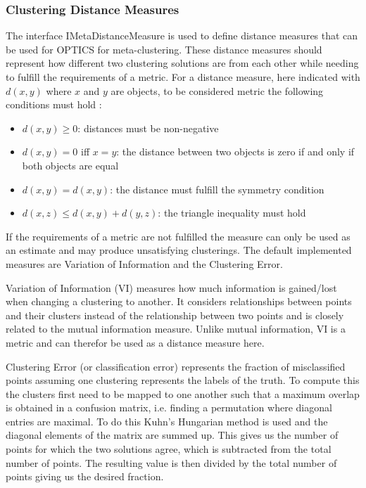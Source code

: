 \documentclass[
	a4paper,
	english,
	twoside,
	openright,               
	11pt                            
	]{report}
\begin{document}
\subsubsection{Clustering Distance Measures}
The interface IMetaDistanceMeasure is used to define distance measures that can be used for OPTICS for meta-clustering. These distance measures should represent how different two clustering solutions are from each other while needing to fulfill the requirements of a metric. For a distance measure, here indicated with $d(x,y)$ where $x$ and $y$ are objects, to be considered metric the following conditions must hold \cite{10.5555/1756006.1953024}:
\begin{itemize}
  \item $d(x,y)\geq0$: distances must be non-negative
  \item $d(x,y)=0$ iff $x=y$: the distance between two objects is zero if and only if both objects are equal
  \item $d(x,y)=d(x,y)$: the distance must fulfill the symmetry condition
  \item $d(x,z)\leq d(x,y)+d(y,z)$: the triangle inequality must hold
\end{itemize}

If the requirements of a metric are not fulfilled the measure can only be used as an estimate and may produce unsatisfying clusterings. The default implemented measures are Variation of Information and the Clustering Error. 

Variation of Information (VI) \cite{10.1007/978-3-540-45167-9_14} measures how much information is gained/lost when changing a clustering to another. It considers relationships between points and their clusters instead of the relationship between two points and is closely related to the mutual information measure. Unlike mutual information, VI is a metric and can therefor be used as a distance measure here.

Clustering Error (or classification error) \cite{MEILA2007873} represents the fraction of misclassified points assuming one clustering represents the labels of the truth. To compute this the clusters first need to be mapped to one another such that a maximum overlap is obtained in a confusion matrix, i.e. finding a permutation where diagonal entries are maximal. To do this Kuhn’s Hungarian method \cite{Kuhn2010} is used and the diagonal elements of the matrix are summed up. This gives us the number of points for which the two solutions agree, which is subtracted from the total number of points. The resulting value is then divided by the total number of points giving us the desired fraction.
\end{document}
